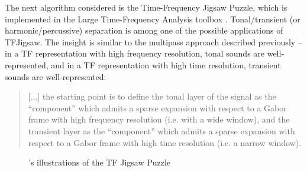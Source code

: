 \documentclass[letter,12pt]{article}
\begin{document}
The next algorithm considered is the Time-Frequency Jigsaw Puzzle\cite{tfjigsaw}, which is implemented in the Large Time-Frequency Analysis toolbox \cite{ltfat, tfjigsaw2, tfjigsaw3}. Tonal/transient (or harmonic/percussive) separation is among one of the possible applications of TFJigsaw. The insight is similar to the multipass approach described previously -- in a TF representation with high frequency resolution, tonal sounds are well-represented, and in a TF representation with high time resolution, transient sounds are well-represented:

\begin{quote}
	[...] the starting point is to define the tonal layer of the signal as the ``component'' which admits a sparse expansion with respect to a Gabor frame with high frequency resolution (i.e. with a wide window), and the transient layer as the ``component'' which admits a sparse expansion with respect to a Gabor frame with high time resolution (i.e. a narrow window).
\end{quote}

\begin{figure}[ht]
	\centering
	\hspace{1em}
	\caption{\citet{tfjigsaw}'s illustrations of the TF Jigsaw Puzzle}
	\label{fig:supertiles}
\end{figure}
\end{document}
